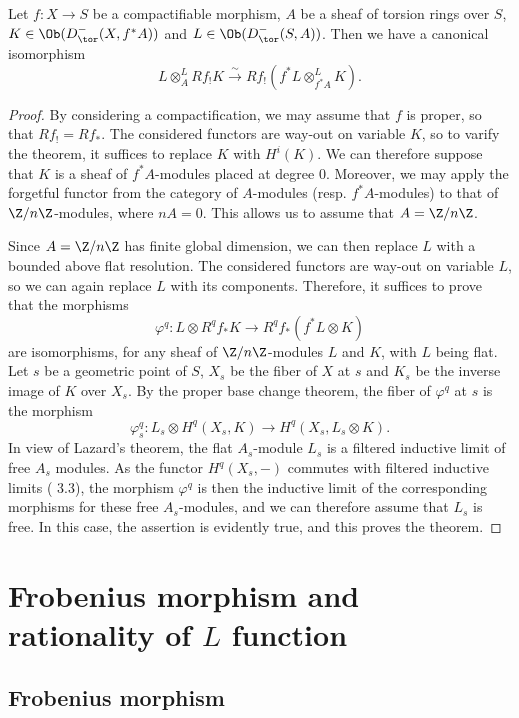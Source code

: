 \begin{theorem}\label{scheme morphism compactifiable projection formula}
Let $f:X\to S$ be a compactifiable morphism, $A$ be a sheaf of torsion rings over $S$, $K\in\Ob(D^-_{\tor}(X,f^*A))$ and $L\in\Ob(D^-_{\tor}(S,A))$. Then we have a canonical isomorphism
\[L\otimes_A^LRf_!K\stackrel{\sim}{\to}Rf_!(f^*L\otimes^L_{f^*A}K).\]
\end{theorem}
\begin{proof}
By considering a compactification, we may assume that $f$ is proper, so that $Rf_!=Rf_*$. The considered functors are way-out on variable $K$, so to varify the theorem, it suffices to replace $K$ with $H^i(K)$. We can therefore suppose that $K$ is a sheaf of $f^*A$-modules placed at degree $0$. Moreover, we may apply the forgetful functor from the category of $A$-modules (resp. $f^*A$-modules) to that of $\Z/n\Z$-modules, where $nA=0$. This allows us to assume that $A=\Z/n\Z$.\par
Since $A=\Z/n\Z$ has finite global dimension, we can then replace $L$ with a bounded above flat resolution. The considered functors are way-out on variable $L$, so we can again replace $L$ with its components. Therefore, it suffices to prove that the morphisms
\[\varphi^q:L\otimes R^qf_*K\to R^qf_*(f^*L\otimes K)\]
are isomorphisms, for any sheaf of $\Z/n\Z$-modules $L$ and $K$, with $L$ being flat. Let $s$ be a geometric point of $S$, $X_s$ be the fiber of $X$ at $s$ and $K_s$ be the inverse image of $K$ over $X_s$. By the proper base change theorem, the fiber of $\varphi^q$ at $s$ is the morphism
\[\varphi_s^q:L_s\otimes H^q(X_s,K)\to H^q(X_s,L_s\otimes K).\]
In view of Lazard's theorem, the flat $A_s$-module $L_s$ is a filtered inductive limit of free $A_s$ modules. As the functor $H^q(X_s,-)$ commutes with filtered inductive limits (\cite{SGA4}  3.3), the morphism $\varphi^q$ is then the inductive limit of the corresponding morphisms for these free $A_s$-modules, and we can therefore assume that $L_s$ is free. In this case, the assertion is evidently true, and this proves the theorem.
\end{proof}

\section{Frobenius morphism and rationality of \texorpdfstring{$L$}{L} function}
\subsection{Frobenius morphism}
